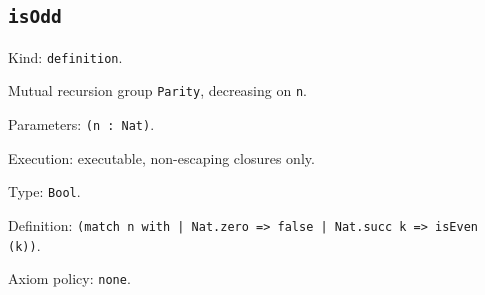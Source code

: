 \documentclass[11pt]{article}
\begin{document}
\subsection*{\texttt{isOdd}}
\noindent Kind: \texttt{definition}.\par
\noindent Mutual recursion group \texttt{Parity}, decreasing on \texttt{n}.\par
\noindent Parameters: \texttt{(n : Nat)}.\par
\noindent Execution: executable, non-escaping closures only.\par
\noindent Type: \texttt{Bool}.\par
\noindent Definition: \texttt{(match n with | Nat.zero => false | Nat.succ k => isEven (k))}.\par
\noindent Axiom policy: \texttt{none}.\par
\end{document}
